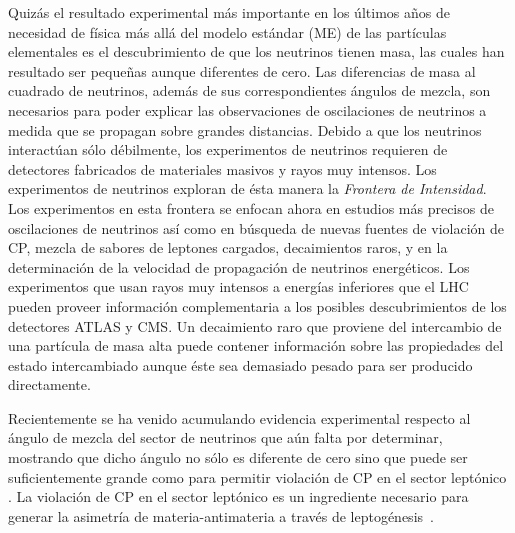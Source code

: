 Quizás el resultado experimental más importante en los últimos años de
necesidad de física más allá del modelo estándar (ME) de las
partículas elementales es el descubrimiento de que los neutrinos
tienen masa, las cuales han resultado ser pequeñas aunque diferentes de
cero. Las diferencias de masa al cuadrado de neutrinos, además de sus
correspondientes ángulos de mezcla, son necesarios para poder explicar
las observaciones de oscilaciones de neutrinos a medida que se
propagan sobre grandes distancias. Debido a que los neutrinos
interactúan sólo débilmente, los experimentos de neutrinos requieren
de detectores fabricados de materiales masivos y rayos muy
intensos. Los experimentos de neutrinos exploran de ésta manera la
\emph{Frontera de Intensidad}. Los experimentos en esta frontera se
enfocan ahora en estudios más precisos de oscilaciones de neutrinos
así como en búsqueda de nuevas fuentes de violación de CP, mezcla de
sabores de leptones cargados, decaimientos raros, y en la
determinación de la velocidad de propagación de neutrinos
energéticos. Los experimentos que usan rayos muy intensos a energías
inferiores que el LHC pueden proveer información complementaria a los
posibles descubrimientos de los detectores ATLAS y CMS. Un decaimiento
raro que proviene del intercambio de una partícula de masa alta puede
contener información sobre las propiedades del estado intercambiado
aunque éste sea demasiado pesado para ser producido directamente.

Recientemente se ha venido acumulando evidencia experimental respecto
al ángulo de mezcla del sector de neutrinos que aún falta por
determinar, mostrando que dicho ángulo no sólo es diferente de cero
sino que puede ser suficientemente grande como para permitir violación
de CP en el sector leptónico \cite{valle}. La violación de CP en el
sector leptónico es un ingrediente necesario para generar la asimetría
de materia-antimateria a través de
leptogénesis~\cite{Davidson:2008bu}.


